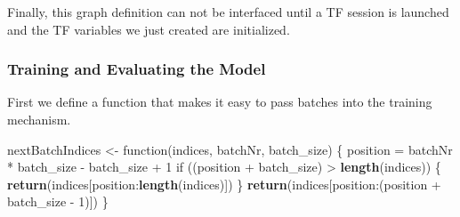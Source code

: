 \documentclass[]{article}
\newenvironment{Shaded}{\begin{snugshade}}{\end{snugshade}}
\newcommand{\KeywordTok}[1]{\textcolor[rgb]{0.13,0.29,0.53}{\textbf{{#1}}}}
\newcommand{\DataTypeTok}[1]{\textcolor[rgb]{0.13,0.29,0.53}{{#1}}}
\newcommand{\DecValTok}[1]{\textcolor[rgb]{0.00,0.00,0.81}{{#1}}}
\newcommand{\StringTok}[1]{\textcolor[rgb]{0.31,0.60,0.02}{{#1}}}
\newcommand{\NormalTok}[1]{{#1}}
\begin{document}
\begin{Shaded}
\end{Shaded}

Finally, this graph definition can not be interfaced until a TF session
is launched and the TF variables we just created are initialized.

\begin{Shaded}
\end{Shaded}

\subsubsection{Training and Evaluating the
Model}\label{training-and-evaluating-the-model}

First we define a function that makes it easy to pass batches into the
training mechanism.

\begin{Shaded}
\begin{Highlighting}[]
\NormalTok{nextBatchIndices <-}\StringTok{ }\NormalTok{function(indices, batchNr, batch_size) \{}
  \NormalTok{position =}\StringTok{ }\NormalTok{batchNr *}\StringTok{ }\NormalTok{batch_size -}\StringTok{ }\NormalTok{batch_size +}\StringTok{ }\DecValTok{1}
  \NormalTok{if ((position +}\StringTok{ }\NormalTok{batch_size) >}\StringTok{ }\KeywordTok{length}\NormalTok{(indices)) \{}
    \KeywordTok{return}\NormalTok{(indices[position:}\KeywordTok{length}\NormalTok{(indices)])}
  \NormalTok{\}}
  \KeywordTok{return}\NormalTok{(indices[position:(position +}\StringTok{ }\NormalTok{batch_size -}\StringTok{ }\DecValTok{1}\NormalTok{)])}
\NormalTok{\}}
\end{Highlighting}
\end{Shaded}
\end{document}
